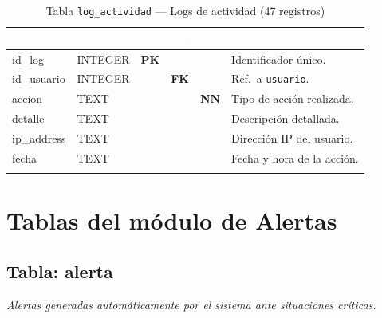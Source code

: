 \documentclass[11pt,a4paper]{article}
\newcommand{\tableheadrow}{\rowcolor{tableheader}}
\newcommand{\tablehead}[1]{\textcolor{white}{\textbf{#1}}}
\newcommand{\pk}{\textcolor{emiblue}{\textbf{PK}}}
\newcommand{\fk}{\textcolor{orange!80!black}{\textbf{FK}}}
\newcommand{\nn}{\textcolor{red!70!black}{\textbf{NN}}}
\begin{document}
\begin{longtable}{p{4.2cm} p{2.8cm} c c c p{4.5cm}}
\toprule
\tableheadrow
\tablehead{Campo} & \tablehead{Tipo} & \tablehead{PK} & \tablehead{FK} & \tablehead{NN} & \tablehead{Descripción} \\
\midrule
\endhead
id\_log & INTEGER & \pk & & & Identificador único. \\
\rowcolor{tablerow}
id\_usuario & INTEGER & & \fk & & Ref.\ a \texttt{usuario}. \\
accion & TEXT & & & \nn & Tipo de acción realizada. \\
\rowcolor{tablerow}
detalle & TEXT & & & & Descripción detallada. \\
ip\_address & TEXT & & & & Dirección IP del usuario. \\
\rowcolor{tablerow}
fecha & TEXT & & & & Fecha y hora de la acción. \\
\bottomrule
\caption{Tabla \texttt{log\_actividad} — Logs de actividad (47 registros)}
\end{longtable}

\section{Tablas del módulo de Alertas}

\subsection{Tabla: alerta}
\textit{Alertas generadas automáticamente por el sistema ante situaciones críticas.}
\end{document}
